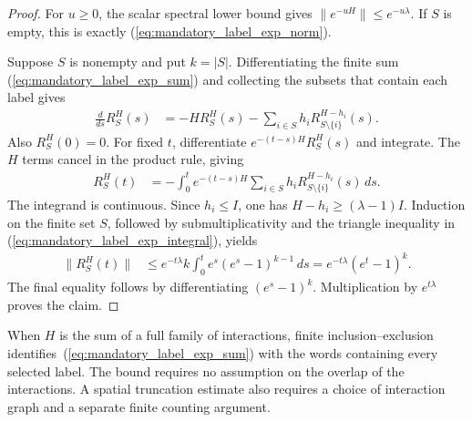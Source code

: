 \begin{proof}\leanok
    For $u\geq0$, the scalar spectral lower bound gives
    $\|e^{-uH}\|\leq e^{-u\lambda}$. If $S$ is empty, this is exactly
    (\ref{eq:mandatory_label_exp_norm}).

    Suppose $S$ is nonempty and put $k=|S|$. Differentiating the finite sum
    (\ref{eq:mandatory_label_exp_sum}) and collecting the subsets that
    contain each label gives
    \begin{align}
        \frac{d}{ds}R_S^H(s)
         & =-H R_S^H(s)
        -\sum_{i\in S}h_iR_{S\setminus\{i\}}^{H-h_i}(s).
        \label{eq:mandatory_label_exp_recursion}
    \end{align}
    Also $R_S^H(0)=0$. For fixed $t$, differentiate
    $e^{-(t-s)H}R_S^H(s)$ and integrate. The $H$ terms cancel in the
    product rule, giving
    \begin{align}
        R_S^H(t)
         & =-\int_0^t e^{-(t-s)H}
        \sum_{i\in S}h_iR_{S\setminus\{i\}}^{H-h_i}(s)\,ds.
        \label{eq:mandatory_label_exp_integral}
    \end{align}
    The integrand is continuous. Since $h_i\leq I$, one has
    $H-h_i\geq(\lambda-1)I$. Induction on the finite set $S$, followed by
    submultiplicativity and the triangle inequality in
    (\ref{eq:mandatory_label_exp_integral}), yields
    \begin{align}
        \|R_S^H(t)\|
         & \leq e^{-t\lambda}k\int_0^t e^s(e^s-1)^{k-1}\,ds
        =e^{-t\lambda}(e^t-1)^k.
    \end{align}
    The final equality follows by differentiating $(e^s-1)^k$.
    Multiplication by $e^{t\lambda}$ proves the claim.
\end{proof}

When $H$ is the sum of a full family of interactions, finite
inclusion--exclusion identifies~(\ref{eq:mandatory_label_exp_sum}) with the
words containing every selected label. The bound requires no assumption
on the overlap of the interactions. A spatial truncation estimate also
requires a choice of interaction graph and a separate finite counting
argument.
